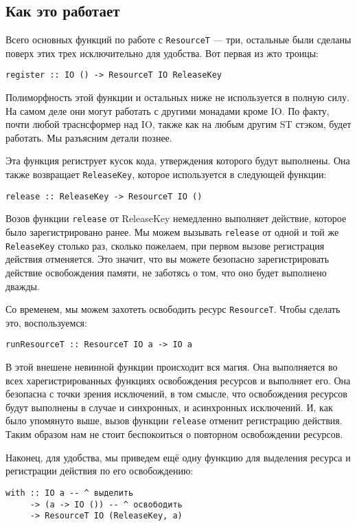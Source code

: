 \subsection{Как это работает}
Всего основных функций по работе с \lstinline'ResourceT' --- три, остальные были
сделаны поверх этих трех исключительно для удобства. Вот первая из жто троицы:
\begin{lstlisting}
register :: IO () -> ResourceT IO ReleaseKey
\end{lstlisting}
Полиморфность этой функции и остальных ниже не используется в полную силу. На самом деле
они могут работать с другими монадами кроме IO. По факту, почти любой траснсформер над
IO, также как на любым другим ST стэком, будет работать. Мы разъясним детали познее.

Эта функция региструет кусок кода, утверждения которого будут выполнены. Она также
возвращает \lstinline'ReleaseKey', которое используется в следующей функции:
\begin{lstlisting}release :: ReleaseKey -> ResourceT IO ()
\end{lstlisting}
Возов функции \verb=release= от ReleaseKey немедленно выполняет действие, которое было
зарегистрировано ранее. Мы можем вызывать \verb=release= от одной и той же
\lstinline'ReleaseKey'
столько раз, сколько пожелаем, при первом вызове регистрация действия отменяется. Это
значит, что вы можете безопасно зарегистрировать действие освобождения памяти, не
заботясь о том, что оно будет выполнено дважды.

Со временем, мы можем захотеть освободить ресурс \lstinline'ResourceT'. Чтобы сделать это,
воспользуемся:
\begin{lstlisting}
runResourceT :: ResourceT IO a -> IO a
\end{lstlisting}
В этой внешене невинной функции происходит вся магия. Она выполняется во всех
харегистрированных функциях освобождения ресурсов и выполняет его. Она безопасна с точки
зрения исключений, в
том смысле, что освобождения ресурсов будут выполнены в случае и синхронных, и
асинхронных исключений. И, как было упомянуто выше, вызов функции \lstinline'release'
отменит
регистрацию действия. Таким образом нам не стоит беспокоиться о повторном освобождении
ресурсов.

Наконец, для удобства, мы приведем ещё одну функцию для выделения ресурса и регистрации
действия по его освобождению:
\begin{lstlisting}
with :: IO a -- ^ выделить
     -> (a -> IO ()) -- ^ освободить
     -> ResourceT IO (ReleaseKey, a)
\end{lstlisting}

